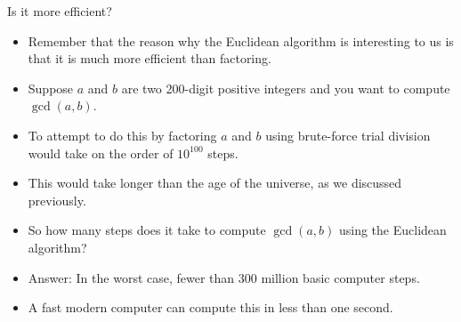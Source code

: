 \documentclass{beamer}
\begin{document}
\begin{frame}{Is it more efficient?}
\begin{itemize}
\item Remember that the reason why the Euclidean algorithm is interesting to us is that it is much more
efficient than factoring.
\item Suppose $a$ and $b$ are two 200-digit positive integers and you want to compute $\gcd(a,b)$.
\item To attempt to do this by factoring $a$ and $b$ using brute-force trial division would
take on the order of $10^{100}$ steps.
\item This would take longer than the age of the universe, as we discussed previously.
\item So how many steps does it take to compute $\gcd(a,b)$ using the Euclidean algorithm?
\item Answer: In the worst case, fewer than 300 million basic computer steps.
\item A fast modern computer can compute this in less than one second.

\end{itemize}
\end{frame}
\end{document}

